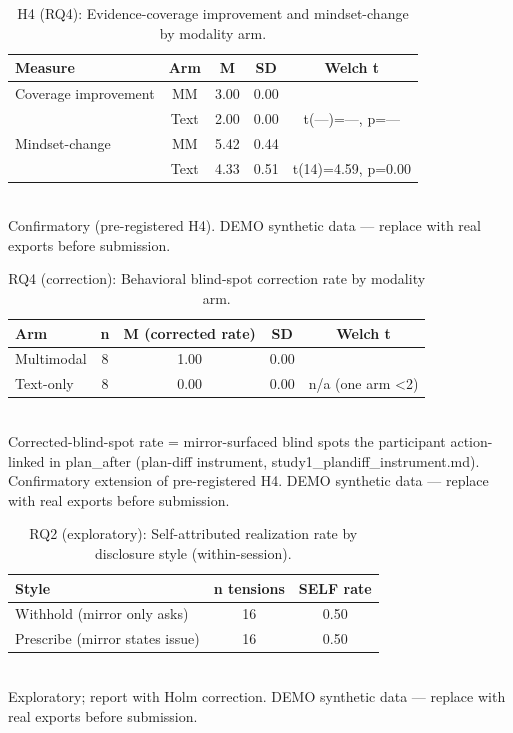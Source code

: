 \begin{table}[t]
  \centering
  \caption{H4 (RQ4): Evidence-coverage improvement and mindset-change by modality arm.}
  \begin{tabular}{l c c c c}
    \toprule
    Measure & Arm & M & SD & Welch t \\
    \midrule
    Coverage improvement & MM & 3.00 & 0.00 &  \\
     & Text & 2.00 & 0.00 & t(—)=—, p=— \\
    Mindset-change & MM & 5.42 & 0.44 &  \\
     & Text & 4.33 & 0.51 & t(14)=4.59, p=0.00 \\
    \bottomrule
  \end{tabular}
  \label{tab:h4}
  \\ \footnotesize Confirmatory (pre-registered H4). DEMO synthetic data — replace with real exports before submission.
\end{table}


\begin{table}[t]
  \centering
  \caption{RQ4 (correction): Behavioral blind-spot correction rate by modality arm.}
  \begin{tabular}{l c c c c}
    \toprule
    Arm & n & M (corrected rate) & SD & Welch t \\
    \midrule
    Multimodal & 8 & 1.00 & 0.00 &  \\
    Text-only & 8 & 0.00 & 0.00 & n/a (one arm <2) \\
    \bottomrule
  \end{tabular}
  \label{tab:h4corr}
  \\ \footnotesize Corrected-blind-spot rate = mirror-surfaced blind spots the participant action-linked in plan\_after (plan-diff instrument, study1\_plandiff\_instrument.md). Confirmatory extension of pre-registered H4. DEMO synthetic data — replace with real exports before submission.
\end{table}


\begin{table}[t]
  \centering
  \caption{RQ2 (exploratory): Self-attributed realization rate by disclosure style (within-session).}
  \begin{tabular}{l c c}
    \toprule
    Style & n tensions & SELF rate \\
    \midrule
    Withhold (mirror only asks) & 16 & 0.50 \\
    Prescribe (mirror states issue) & 16 & 0.50 \\
    \bottomrule
  \end{tabular}
  \label{tab:rq2}
  \\ \footnotesize Exploratory; report with Holm correction. DEMO synthetic data — replace with real exports before submission.
\end{table}
